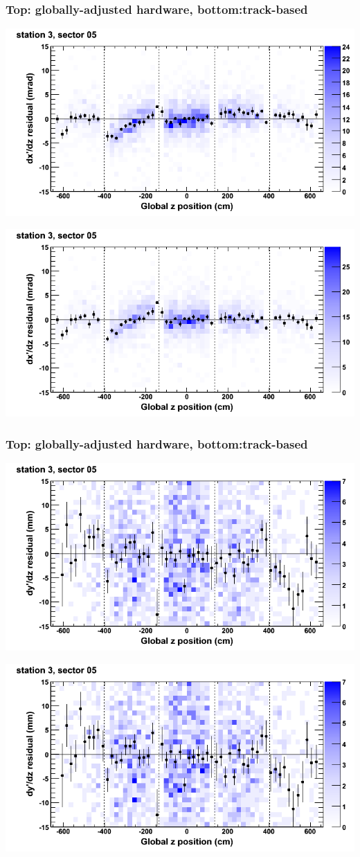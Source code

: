\documentclass[compress]{beamer}
\begin{document}
\begin{frame}
\frametitle{Top: globally-adjusted hardware, bottom:track-based}
\includegraphics[width=0.7\linewidth]{NOV4_mapplots_HW/DTvsz_st3sec05_dxdz.png}

\includegraphics[width=0.7\linewidth]{NOV4_mapplots/DTvsz_st3sec05_dxdz.png}
\end{frame}

\begin{frame}
\frametitle{Top: globally-adjusted hardware, bottom:track-based}
\includegraphics[width=0.7\linewidth]{NOV4_mapplots_HW/DTvsz_st3sec05_dydz.png}

\includegraphics[width=0.7\linewidth]{NOV4_mapplots/DTvsz_st3sec05_dydz.png}
\end{frame}
\end{document}
